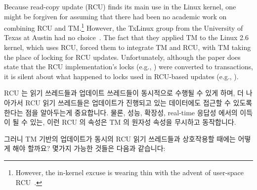 Because read-copy update (RCU) finds its main use in the Linux kernel,
one might be forgiven for assuming that there had been no academic work
on combining RCU and TM.\footnote{
	However, the in-kernel excuse is wearing thin with the advent
	of user-space RCU~\cite{MathieuDesnoyers2009URCU,MathieuDesnoyers2012URCU}.}
However, the TxLinux group from the University of Texas at Austin had
no choice~\cite{ChistopherJRossbach2007a}.
The fact that they applied TM to the Linux 2.6 kernel, which uses RCU,
forced them to integrate TM and RCU, with TM taking the place of locking
for RCU updates.
Unfortunately, although the paper does state that the RCU implementation's
locks (e.g., ) were converted to transactions,
it is silent about what happened to locks used in RCU-based updates
(e.g., ).
\fi

RCU 는 읽기 쓰레드들과 업데이트 쓰레드들이 동시적으로 수행될 수 있게 하며, 더
나아가서 RCU 읽기 쓰레드들은 업데이트가 진행되고 있는 데이터에도 접근할 수
있도록 한다는 점을 알아두는게 중요합니다.
물론, 성능, 확장성, real-time 응답성 에서의 이득이 될 수 있는, 이런 RCU 의
속성은 TM 의 원자성 속성을 무시하고 동작합니다.

그러니 TM 기반의 업데이트가 동시의 RCU 읽기 쓰레드들과 상호작용할 때에는 어떻게
해야 할까요?
몇가지 가능한 것들은 다음과 같습니다:

